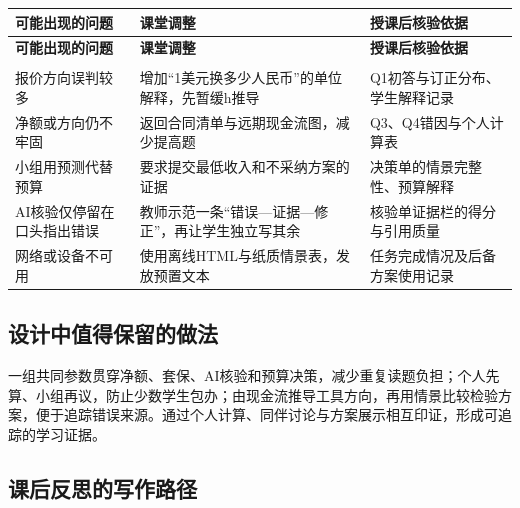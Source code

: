 \documentclass[lang=cn,11pt,oneside,openany,chinesefont=nofont,color=blue,titlestyle=hang]{elegantbook}
\begin{document}
\begingroup\small{}\setlength{\tabcolsep}{6pt}\renewcommand{\arraystretch}{1.24}
\begin{longtable}{>{\raggedright\arraybackslash}p{}>{\raggedright\arraybackslash}p{}>{\raggedright\arraybackslash}p{}}
\toprule[.8pt]\rowcolor{Navy}
\color{white}\bfseries 可能出现的问题 & \color{white}\bfseries 课堂调整 & \color{white}\bfseries 授课后核验依据 \\
\midrule\endfirsthead
\toprule[.8pt]\rowcolor{Navy}
\color{white}\bfseries 可能出现的问题 & \color{white}\bfseries 课堂调整 & \color{white}\bfseries 授课后核验依据 \\
\midrule\endhead
\midrule\multicolumn{3}{r}{\footnotesize\color{Muted}续下页}\\\endfoot
\bottomrule[.8pt]\endlastfoot
报价方向误判较多 & 增加“1美元换多少人民币”的单位解释，先暂缓h推导 & Q1初答与订正分布、学生解释记录 \\
\midrule[.25pt]
\rowcolor{Pale}
净额或方向仍不牢固 & 返回合同清单与远期现金流图，减少提高题 & Q3、Q4错因与个人计算表 \\
\midrule[.25pt]
小组用预测代替预算 & 要求提交最低收入和不采纳方案的证据 & 决策单的情景完整性、预算解释 \\
\midrule[.25pt]
\rowcolor{Pale}
AI核验仅停留在口头指出错误 & 教师示范一条“错误—证据—修正”，再让学生独立写其余 & 核验单证据栏的得分与引用质量 \\
\midrule[.25pt]
网络或设备不可用 & 使用离线HTML与纸质情景表，发放预置文本 & 任务完成情况及后备方案使用记录 \\
\midrule[.25pt]
\end{longtable}\endgroup

\subsection*{设计中值得保留的做法}

一组共同参数贯穿净额、套保、AI核验和预算决策，减少重复读题负担；个人先算、小组再议，防止少数学生包办；由现金流推导工具方向，再用情景比较检验方案，便于追踪错误来源。通过个人计算、同伴讨论与方案展示相互印证，形成可追踪的学习证据。

\subsection*{课后反思的写作路径}
\end{document}
